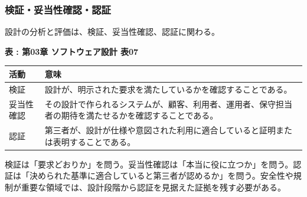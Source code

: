 \subsubsection{検証・妥当性確認・認証}

設計の分析と評価は、検証、妥当性確認、認証に関わる。

\par\smallskip\noindent{}\label{tab:ch03-07}\textbf{表 \thetable: 第03章 ソフトウェア設計 表07}\par\smallskip
\begin{tabularx}{\linewidth}{L{32mm}Y}
\toprule
\textbf{活動} & \textbf{意味} \\
\midrule
検証 & 設計が、明示された要求を満たしているかを確認することである。 \\
妥当性確認 & その設計で作られるシステムが、顧客、利用者、運用者、保守担当者の期待を満たせるかを確認することである。 \\
認証 & 第三者が、設計が仕様や意図された利用に適合していると証明または表明することである。 \\
\bottomrule
\end{tabularx}

検証は「要求どおりか」を問う。妥当性確認は「本当に役に立つか」を問う。認証は「決められた基準に適合していると第三者が認めるか」を問う。安全性や規制が重要な領域では、設計段階から認証を見据えた証拠を残す必要がある。
